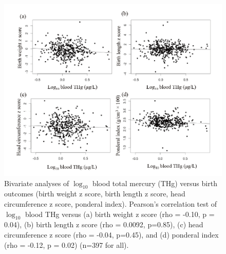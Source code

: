 \begin{figure}
  \centering
    \label{fig:Fig318}
  \includegraphics[scale=1]{Figures/Fig318.pdf}
  \caption[Bivariate analyses of $\log_{10}$ blood total mercury versus birth outcomes (birth weight z score, birth length z score, head circumference z score, ponderal index)]{Bivariate analyses of $\log_{10}$ blood total mercury (THg) versus birth outcomes (birth weight z score, birth length z score, head circumference z score, ponderal index). Pearson's correlation test of $\log_{10}$ blood THg versus (a) birth weight z score (rho = -0.10, p = 0.04), (b) birth length z score (rho = 0.0092, p=0.85), (c) head circumference z score (rho = -0.04, p=0.45), and (d) ponderal index (rho = -0.12, p = 0.02) (n=397 for all).}
\end{figure}


